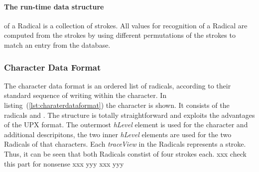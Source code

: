 \paragraph{The run-time data structure} of a Radical is a collection of strokes.
All values for recognition of a Radical are computed from the strokes
by using different permutations of the strokes to match an entry from the
database.

\subsubsection{Character Data Format}
\label{sec:hwre:characterdataformat}

The character data format is an ordered list of radicals, according to their
standard sequence of writing within the character. In 
listing~(\ref{lst:charaterdataformat}) the character  is shown.
It consists of the radicals  and . The structure is totally
straightforward and exploits the advantages of the UPX format.
The outermost \emph{hLevel} element is used for the character and additional
descripitons, the two inner \emph{hLevel} elements are used for the two
Radicals of that characters. Each \emph{traceView} in the Radicals represents
a stroke. Thus, it can be seen that both Radicals constist of four strokes each.
xxx check this part for nonsense xxx yyy xxx yyy

